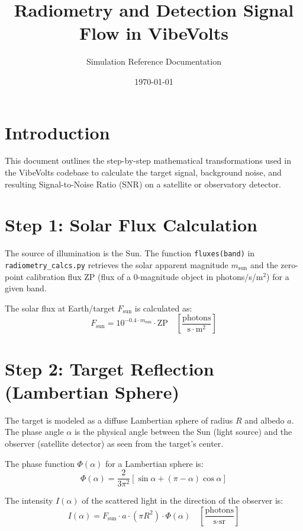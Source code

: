\documentclass[11pt,a4paper]{article}
\title{Radiometry and Detection Signal Flow in VibeVolts}
\author{Simulation Reference Documentation}
\date{\today}
\begin{document}
\maketitle

\section{Introduction}
This document outlines the step-by-step mathematical transformations used in the VibeVolts codebase to calculate the target signal, background noise, and resulting Signal-to-Noise Ratio (SNR) on a satellite or observatory detector.

\section{Step 1: Solar Flux Calculation}
The source of illumination is the Sun. The function \texttt{fluxes(band)} in \texttt{radiometry\_calcs.py} retrieves the solar apparent magnitude $m_{\text{sun}}$ and the zero-point calibration flux $\text{ZP}$ (flux of a 0-magnitude object in photons/s/m$^2$) for a given band. 

The solar flux at Earth/target $F_{\text{sun}}$ is calculated as:
\begin{equation}
    F_{\text{sun}} = 10^{-0.4 \cdot m_{\text{sun}}} \cdot \text{ZP} \quad \left[\frac{\text{photons}}{\text{s} \cdot \text{m}^2}\right]
\end{equation}

\section{Step 2: Target Reflection (Lambertian Sphere)}
The target is modeled as a diffuse Lambertian sphere of radius $R$ and albedo $a$. The phase angle $\alpha$ is the physical angle between the Sun (light source) and the observer (satellite detector) as seen from the target's center.

The phase function $\Phi(\alpha)$ for a Lambertian sphere is:
\begin{equation}
    \Phi(\alpha) = \frac{2}{3\pi^2} \left[ \sin\alpha + (\pi - \alpha)\cos\alpha \right]
\end{equation}

The intensity $I(\alpha)$ of the scattered light in the direction of the observer is:
\begin{equation}
    I(\alpha) = F_{\text{sun}} \cdot a \cdot (\pi R^2) \cdot \Phi(\alpha) \quad \left[\frac{\text{photons}}{\text{s} \cdot \text{sr}}\right]
\end{equation}
\end{document}
